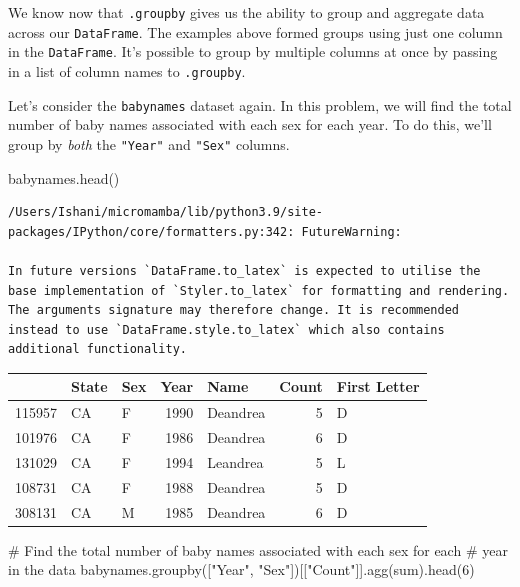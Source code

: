 \documentclass[
  letterpaper,
  DIV=11,
  numbers=noendperiod]{scrreprt}
\newenvironment{Shaded}{\begin{snugshade}}{\end{snugshade}}
\newcommand{\BuiltInTok}[1]{\textcolor[rgb]{0.00,0.23,0.31}{#1}}
\newcommand{\CommentTok}[1]{\textcolor[rgb]{0.37,0.37,0.37}{#1}}
\newcommand{\DecValTok}[1]{\textcolor[rgb]{0.68,0.00,0.00}{#1}}
\newcommand{\NormalTok}[1]{\textcolor[rgb]{0.00,0.23,0.31}{#1}}
\newcommand{\StringTok}[1]{\textcolor[rgb]{0.13,0.47,0.30}{#1}}
\begin{document}
We know now that \texttt{.groupby} gives us the ability to group and
aggregate data across our \texttt{DataFrame}. The examples above formed
groups using just one column in the \texttt{DataFrame}. It's possible to
group by multiple columns at once by passing in a list of column names
to \texttt{.groupby}.

Let's consider the \texttt{babynames} dataset again. In this problem, we
will find the total number of baby names associated with each sex for
each year. To do this, we'll group by \emph{both} the \texttt{"Year"}
and \texttt{"Sex"} columns.

\begin{Shaded}
\begin{Highlighting}[]
\NormalTok{babynames.head()}
\end{Highlighting}
\end{Shaded}

\begin{verbatim}
/Users/Ishani/micromamba/lib/python3.9/site-packages/IPython/core/formatters.py:342: FutureWarning:

In future versions `DataFrame.to_latex` is expected to utilise the base implementation of `Styler.to_latex` for formatting and rendering. The arguments signature may therefore change. It is recommended instead to use `DataFrame.style.to_latex` which also contains additional functionality.
\end{verbatim}

\begin{tabular}{lllrlrl}
\toprule
{} & State & Sex &  Year &      Name &  Count & First Letter \\
\midrule
115957 &    CA &   F &  1990 &  Deandrea &      5 &            D \\
101976 &    CA &   F &  1986 &  Deandrea &      6 &            D \\
131029 &    CA &   F &  1994 &  Leandrea &      5 &            L \\
108731 &    CA &   F &  1988 &  Deandrea &      5 &            D \\
308131 &    CA &   M &  1985 &  Deandrea &      6 &            D \\
\bottomrule
\end{tabular}

\begin{Shaded}
\begin{Highlighting}[]
\CommentTok{\# Find the total number of baby names associated with each sex for each }
\CommentTok{\# year in the data}
\NormalTok{babynames.groupby([}\StringTok{"Year"}\NormalTok{, }\StringTok{"Sex"}\NormalTok{])[[}\StringTok{"Count"}\NormalTok{]].agg(}\BuiltInTok{sum}\NormalTok{).head(}\DecValTok{6}\NormalTok{)}
\end{Highlighting}
\end{Shaded}
\end{document}
